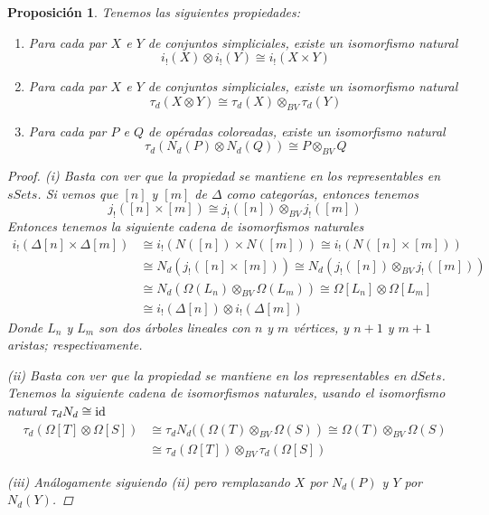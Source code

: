 \documentclass[11pt,a4paper,openright,oneside]{article}
\numberwithin{equation}{section}
\newtheorem{prop}[teo]{Proposici\'on}
\theoremstyle{definition}
\begin{document}
\begin{prop}
    Tenemos las siguientes propiedades:
    \begin{enumerate}
        \item[{\rm (i)}] Para cada par $X$ e $Y$ de conjuntos simpliciales, existe un isomorfismo natural
              $$
                  i_!(X)\otimes i_!(Y) \cong i_!(X\times Y)
              $$
        \item[{\rm (ii)}] Para cada par $X$ e $Y$ de conjuntos simpliciales, existe un isomorfismo natural
              $$
                  \tau_d(X\otimes Y) \cong \tau_d(X) \otimes_{BV} \tau_d(Y)
              $$
        \item[{\rm (iii)}] Para cada par $P$ e $Q$ de op\'eradas coloreadas, existe un isomorfismo natural
              $$
                  \tau_d(N_d(P)\otimes N_d(Q)) \cong P \otimes_{BV} Q
              $$
    \end{enumerate}
    \begin{proof}
        (i) Basta con ver que la propiedad se mantiene en los representables en $sSets$. Si vemos que $[n]$ y $[m]$ de $\Delta$ como categor\'ias, entonces tenemos
        $$
            j_!([n]\times [m]) \cong j_!([n]) \otimes_{BV} j_!([m])
        $$
        Entonces tenemos la siguiente cadena de isomorfismos naturales
        \begin{align*}
            i_!(\Delta[n]\times\Delta[m]) & \cong i_!(N([n])\times N([m]))\cong i_!(N([n]\times[m]))                          \\
                                          & \cong N_d(j_!([n]\times [m])) \cong N_d(j_!([n])\otimes_{BV}j_!([m]))             \\
                                          & \cong N_d(\Omega(L_n)\otimes_{BV}\Omega(L_m)) \cong \Omega[L_n]\otimes\Omega[L_m] \\
                                          & \cong i_!(\Delta[n])\otimes i_!(\Delta[m])
        \end{align*}
        Donde $L_n$ y $L_m$ son dos \'arboles lineales con $n$ y $m$ v\'ertices, y $n+1$ y $m+1$ aristas; respectivamente.

        (ii) Basta con ver que la propiedad se mantiene en los representables en $dSets$. Tenemos la siguiente cadena de isomorfismos naturales, usando el isomorfismo natural $\tau_d N_d\cong \rm id$
        \begin{align*}
            \tau_d(\Omega[T]\otimes\Omega[S]) & \cong \tau_d N_d((\Omega(T)\otimes_{BV}\Omega(S)) \cong \Omega(T)\otimes_{BV}\Omega(S) \\
                                              & \cong \tau_d(\Omega[T])\otimes_{BV}\tau_d(\Omega[S])
        \end{align*}

        (iii) An\'alogamente siguiendo (ii) pero remplazando $X$ por $N_d(P)$ y $Y$ por $N_d(Y)$.
    \end{proof}
\end{prop}
\newpage
\end{document}
